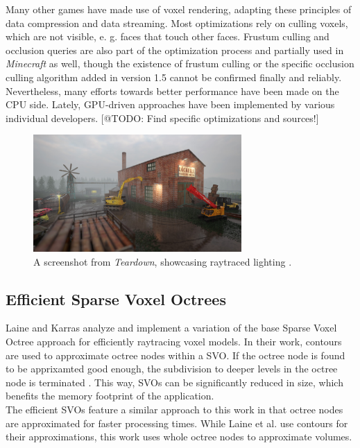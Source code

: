 \noindent
Many other games have made use of voxel rendering, adapting these principles of data compression and data streaming. 
Most optimizations rely on culling voxels, which are not visible, e. g. faces that touch other faces.
Frustum culling and occlusion queries are also part of the optimization process and partially used in \emph{Minecraft} 
as well, though the existence of frustum culling or the specific occlusion culling algorithm added in version 1.5 
cannot be confirmed finally and reliably. Nevertheless, many efforts towards better performance have been made on the 
\ac{CPU} side. Lately, \ac{GPU}-driven approaches have been implemented by various individual developers. 
[@TODO: Find specific optimizations and sources!]  \\

\begin{figure}[h]
    \centering
    \includegraphics[width=300px]{images/graphics/teardown-ray-tracing.jpg}
    \caption{A screenshot from \emph{Teardown}, showcasing raytraced lighting \cite{TeardownSteam2022}.}
    \label{fig:teardown-raytracing}
\end{figure}

\subsection*{Efficient Sparse Voxel Octrees}

Laine and Karras \cite{Laine2010} analyze and implement a variation of the base Sparse Voxel Octree approach for 
efficiently raytracing voxel models. In their work, contours are used to approximate octree nodes within a \ac{SVO}. If the 
octree node is found to be apprixamted good enough, the subdivision to deeper levels in the octree node is terminated
\cite{Kampe2013,Laine2010}. This way, \ac{SVO}s can be significantly reduced in size, which benefits the memory 
footprint of the application. \\

\noindent
The efficient \ac{SVO}s feature a similar approach to this work in that octree nodes are approximated for faster 
processing times. While Laine et al. use contours for their approximations, this work uses whole octree nodes 
to approximate volumes. \\

